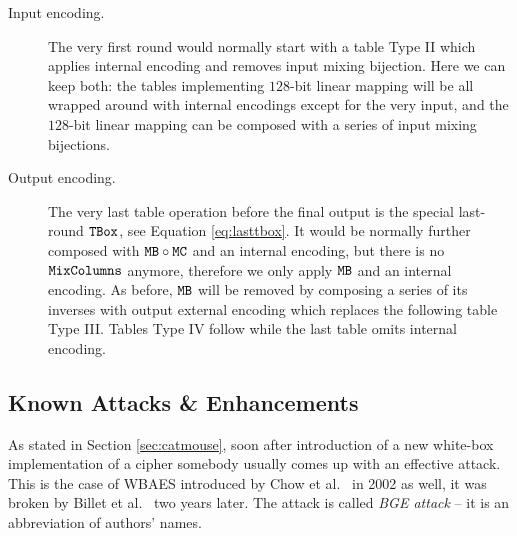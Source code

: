	\begin{description}
		\item[Input encoding.] The very first round would normally start with a table Type II which applies internal encoding and removes input mixing bijection. Here we can keep both: the tables implementing $128$-bit linear mapping will be all wrapped around with internal encodings except for the very input, and the $128$-bit linear mapping can be composed with a series of input mixing bijections.
		\item[Output encoding.] The very last table operation before the final output is the special last-round $\texttt{TBox}$, see Equation \ref{eq:lasttbox}. It would be normally further composed with $\texttt{MB}\circ\texttt{MC}$ and an internal encoding, but there is no $\texttt{MixColumns}$ anymore, therefore we only apply $\texttt{MB}$ and an internal encoding. As before, $\texttt{MB}$ will be removed by composing a series of its inverses with output external encoding which replaces the following table Type III. Tables Type IV follow while the last table omits internal encoding.
	\end{description}
	



\subsection{Known Attacks \& Enhancements}
\label{sec:known}

As stated in Section \ref{sec:catmouse}, soon after introduction of a new white-box implementation of a cipher somebody usually comes up with an effective attack. This is the case of WBAES introduced by Chow et al.\ \cite{chow2003aes} in 2002 as well, it was broken by Billet et al.\ \cite{billet2005cryptanalysis} two years later. The attack is called {\em BGE attack} -- it is an abbreviation of authors' names.


